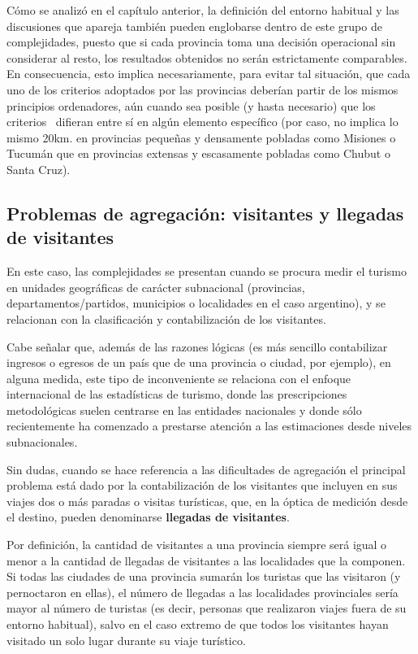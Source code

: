 \documentclass[
  openany]{book}
\begin{document}
Cómo se analizó en el capítulo anterior, la definición del entorno habitual y las discusiones que apareja también pueden englobarse dentro de este grupo de complejidades, puesto que si cada provincia toma una decisión operacional sin considerar al resto, los resultados obtenidos no serán estrictamente comparables. En consecuencia, esto implica necesariamente, para evitar tal situación, que cada uno de los criterios adoptados por las provincias deberían partir de los mismos principios ordenadores, aún cuando sea posible (y hasta necesario) que los criterios~ difieran entre sí en algún elemento específico (por caso, no implica lo mismo 20km. en provincias pequeñas y densamente pobladas como Misiones o Tucumán que en provincias extensas y escasamente pobladas como Chubut o Santa Cruz).

\hypertarget{problemas-de-agregaciuxf3n-visitantes-y-llegadas-de-visitantes}{%
\subsection{Problemas de agregación: visitantes y llegadas de visitantes}\label{problemas-de-agregaciuxf3n-visitantes-y-llegadas-de-visitantes}}

En este caso, las complejidades se presentan cuando se procura medir el turismo en unidades geográficas de carácter subnacional (provincias, departamentos/partidos, municipios o localidades en el caso argentino), y se relacionan con la clasificación y contabilización de los visitantes.

Cabe señalar que, además de las razones lógicas (es más sencillo contabilizar ingresos o egresos de un país que de una provincia o ciudad, por ejemplo), en alguna medida, este tipo de inconveniente se relaciona con el enfoque internacional de las estadísticas de turismo, donde las prescripciones metodológicas suelen centrarse en las entidades nacionales y donde sólo recientemente ha comenzado a prestarse atención a las estimaciones desde niveles subnacionales.

Sin dudas, cuando se hace referencia a las dificultades de agregación el principal problema está dado por la contabilización de los visitantes que incluyen en sus viajes dos o más paradas o visitas turísticas, que, en la óptica de medición desde el destino, pueden denominarse \textbf{llegadas de visitantes}.

Por definición, la cantidad de visitantes a una provincia siempre será igual o menor a la cantidad de llegadas de visitantes a las localidades que la componen. Si todas las ciudades de una provincia sumarán los turistas que las visitaron (y pernoctaron en ellas), el número de llegadas a las localidades provinciales sería mayor al número de turistas (es decir, personas que realizaron viajes fuera de su entorno habitual), salvo en el caso extremo de que todos los visitantes hayan visitado un solo lugar durante su viaje turístico.
\end{document}
